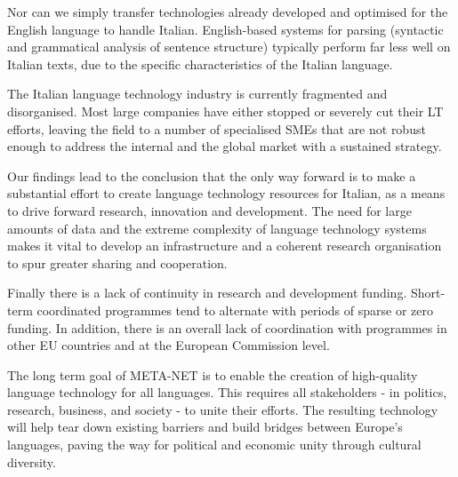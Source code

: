 \documentclass[]{../../metanetpaper}
\begin{document}
\begin{multicols}{2}
Nor can we simply transfer technologies already developed and optimised for the English language to handle Italian. English-based systems for parsing (syntactic and grammatical analysis of sentence structure) typically perform far less well on Italian texts, due to the specific characteristics of the Italian language.

The Italian language technology industry is currently fragmented and disorganised. Most large companies have either stopped or severely cut their LT efforts, leaving the field to a number of specialised SMEs that are not robust enough to address the internal and the global market with a sustained strategy. 

Our findings lead to the conclusion that the only way forward is to make a substantial effort to create language technology resources for Italian, as a means to drive forward research, innovation and development. The need for large amounts of data and the extreme complexity of language technology systems makes it vital to develop an infrastructure and a coherent research organisation to spur greater sharing and cooperation.

Finally there is a lack of continuity in research and development funding. Short-term coordinated programmes tend to alternate with periods of sparse or zero funding. In addition, there is an overall lack of coordination with programmes in other EU countries and at the European Commission level.

The long term goal of META-NET is to enable the creation of high-quality language technology for all languages. This requires all stakeholders - in politics, research, business, and society - to unite their efforts. The resulting technology will help tear down existing barriers and build bridges between Europe's languages, paving the way for political and economic unity through cultural diversity. 
\end{multicols}

\clearpage

\end{document}
